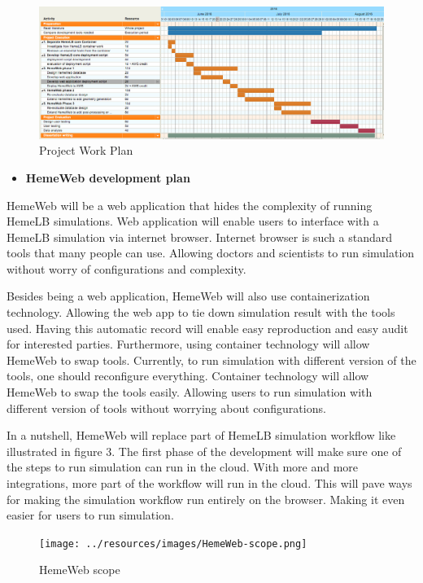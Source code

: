 \documentclass[]{article}
\providecommand{\tightlist}{%
  \setlength{\itemsep}{0pt}\setlength{\parskip}{0pt}}
\begin{document}
\begin{figure}[H]
\centering
\includegraphics{../resources/images/workplan.png}
\caption{Project Work Plan}
\end{figure}

\begin{itemize}
\tightlist
\item
  \textbf{HemeWeb development plan}
\end{itemize}

HemeWeb will be a web application that hides the complexity of running
HemeLB simulations. Web application will enable users to interface with
a HemeLB simulation via internet browser. Internet browser is such a
standard tools that many people can use. Allowing doctors and scientists
to run simulation without worry of configurations and complexity.

Besides being a web application, HemeWeb will also use containerization
technology. Allowing the web app to tie down simulation result with the
tools used. Having this automatic record will enable easy reproduction
and easy audit for interested parties. Furthermore, using container
technology will allow HemeWeb to swap tools. Currently, to run
simulation with different version of the tools, one should reconfigure
everything. Container technology will allow HemeWeb to swap the tools
easily. Allowing users to run simulation with different version of tools
without worrying about configurations.

In a nutshell, HemeWeb will replace part of HemeLB simulation workflow
like illustrated in figure 3. The first phase of the development will
make sure one of the steps to run simulation can run in the cloud. With
more and more integrations, more part of the workflow will run in the
cloud. This will pave ways for making the simulation workflow run
entirely on the browser. Making it even easier for users to run
simulation.

\begin{figure}[H]
\centering
\texttt{[image: ../resources/images/HemeWeb-scope.png]}
\caption{HemeWeb scope}
\end{figure}
\end{document}
